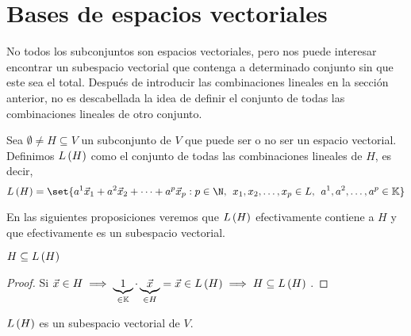 \documentclass[../ecuaciones_diferenciales.tex]{subfiles}
\begin{document}
\section{Bases de espacios vectoriales}

No todos los subconjuntos son espacios vectoriales, pero nos puede interesar encontrar un subespacio vectorial que contenga a determinado conjunto sin que este sea el total. Después de introducir las combinaciones lineales en la sección anterior, no es descabellada la idea de definir el conjunto de todas las combinaciones lineales de otro conjunto.

\begin{definition}
    Sea $\emptyset \neq H \subseteq V$ un subconjunto de $V$ que puede ser o no ser un espacio vectorial. Definimos $L\left(H\right)$ como el conjunto de todas las combinaciones lineales de $H$, es decir,
    \[
        \lspan{H} = \set{\lincomb{a}{x}{p} : p \in \N, \spc \dlst{x}{p} \in L, \spc \ulst{a}{p} \in \K}
    \]
\end{definition}

En las siguientes proposiciones veremos que $L\left(H\right)$ efectivamente contiene a $H$ y que efectivamente es un subespacio vectorial.

\begin{proposition}
    $H \subseteq L\left(H\right)$
\end{proposition}

\begin{proof}
    Si $\vec{x} \in H \implies \underbrace{1}_{\in \mathbb{K}} \cdot \underbrace{\vec{x}}_{\in H} = \vec{x} \in L\left(H\right) \implies H \subseteq L\left(H\right)$
    $ $.
\end{proof}

\begin{proposition}
    $L\left(H\right)$ es un subespacio vectorial de $V$.
\end{proposition}
\end{document}
